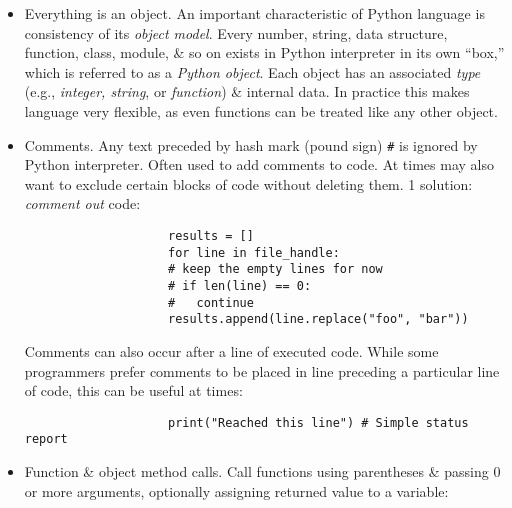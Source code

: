 \documentclass{article}
\newtheorem{remark}{Remark}
\begin{document}
\begin{itemize}
\begin{itemize}
\begin{itemize}
\begin{itemize}
				Love it or hate it, significant whitespace is a fact of life for Python programmers. While it may seem foreign at 1st, will hopefully grow accustomed to it in time.
				\begin{remark}
					Strong recommend using \emph{4 spaces} as your default indentation \& replacing tabs with 4 spaces. Many text editors have a setting that will replace tab stops with spaces automatically insert 4 spaces on new lines following a colon \& replace tabs by 4 spaces.
				\end{remark}
				As you can see by now, Python statements also do not need to be terminated by semicolons. Semicolons can be used, however, to separate multiple statements on a single line:
				\begin{verbatim}
					a = 5; b = 6; c = 7
				\end{verbatim}
				Putting multiple statements on 1 line is generally discouraged in Python as it can make code less readable.
				\item {\sf Everything is an object.} An important characteristic of Python language is consistency of its {\it object model}. Every number, string, data structure, function, class, module, \& so on exists in Python interpreter in its own ``box,'' which is referred to as a {\it Python object}. Each object has an associated {\it type} (e.g., {\it integer, string}, or {\it function}) \& internal data. In practice this makes language very flexible, as even functions can be treated like any other object.
				\item {\sf Comments.} Any text preceded by hash mark (pound sign) \verb|#| is ignored by Python interpreter. Often used to add comments to code. At times may also want to exclude certain blocks of code without deleting them. 1 solution: {\it comment out} code:
				\begin{verbatim}
					results = []
					for line in file_handle:
					# keep the empty lines for now
					# if len(line) == 0:
					#   continue
					results.append(line.replace("foo", "bar"))
				\end{verbatim}
				Comments can also occur after a line of executed code. While some programmers prefer comments to be placed in line preceding a particular line of code, this can be useful at times:
				\begin{verbatim}
					print("Reached this line") # Simple status report
				\end{verbatim}
				\item {\sf Function \& object method calls.} Call functions using parentheses \& passing 0 or more arguments, optionally assigning returned value to a variable:

\end{itemize}
\end{itemize}
\end{itemize}
\end{itemize}
\end{document}
